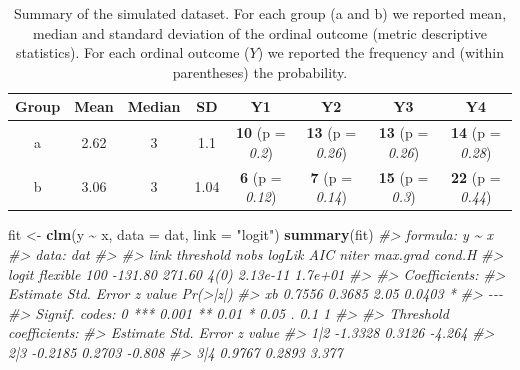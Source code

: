 \documentclass[
  man,floatsintext]{apa6}
\newenvironment{Shaded}{\begin{snugshade}}{\end{snugshade}}
\newcommand{\AttributeTok}[1]{\textcolor[rgb]{0.13,0.29,0.53}{#1}}
\newcommand{\CommentTok}[1]{\textcolor[rgb]{0.56,0.35,0.01}{\textit{#1}}}
\newcommand{\FunctionTok}[1]{\textcolor[rgb]{0.13,0.29,0.53}{\textbf{#1}}}
\newcommand{\NormalTok}[1]{#1}
\newcommand{\OtherTok}[1]{\textcolor[rgb]{0.56,0.35,0.01}{#1}}
\newcommand{\SpecialCharTok}[1]{\textcolor[rgb]{0.81,0.36,0.00}{\textbf{#1}}}
\newcommand{\StringTok}[1]{\textcolor[rgb]{0.31,0.60,0.02}{#1}}
\begin{document}
\begin{table}
\centering
\caption{\label{tab:tab-dataset-example-latex}Summary of the simulated dataset. For each group (a and b) we reported mean, median and standard deviation of the ordinal outcome (metric descriptive statistics). For each ordinal outcome (\(Y\)) we reported the frequency and (within parentheses) the probability.}
\centering
\begin{tabular}[t]{cccccccc}
\toprule
\textbf{Group} & \textbf{Mean} & \textbf{Median} & \textbf{SD} & \textbf{Y1} & \textbf{Y2} & \textbf{Y3} & \textbf{Y4}\\
\midrule
a & 2.62 & 3 & 1.1 & \textbf{10} (p = \textit{0.2}) & \textbf{13} (p = \textit{0.26}) & \textbf{13} (p = \textit{0.26}) & \textbf{14} (p = \textit{0.28})\\
b & 3.06 & 3 & 1.04 & \textbf{6} (p = \textit{0.12}) & \textbf{7} (p = \textit{0.14}) & \textbf{15} (p = \textit{0.3}) & \textbf{22} (p = \textit{0.44})\\
\bottomrule
\end{tabular}
\end{table}

\normalsize

\scriptsize

\normalsize

\scriptsize

\begin{Shaded}
\begin{Highlighting}[]
\NormalTok{fit }\OtherTok{\textless{}{-}} \FunctionTok{clm}\NormalTok{(y }\SpecialCharTok{\textasciitilde{}}\NormalTok{ x, }\AttributeTok{data =}\NormalTok{ dat, }\AttributeTok{link =} \StringTok{"logit"}\NormalTok{)}
\FunctionTok{summary}\NormalTok{(fit)}
\CommentTok{\#\textgreater{} formula: y \textasciitilde{} x}
\CommentTok{\#\textgreater{} data:    dat}
\CommentTok{\#\textgreater{} }
\CommentTok{\#\textgreater{}  link  threshold nobs logLik  AIC    niter max.grad cond.H }
\CommentTok{\#\textgreater{}  logit flexible  100  {-}131.80 271.60 4(0)  2.13e{-}11 1.7e+01}
\CommentTok{\#\textgreater{} }
\CommentTok{\#\textgreater{} Coefficients:}
\CommentTok{\#\textgreater{}    Estimate Std. Error z value Pr(\textgreater{}|z|)  }
\CommentTok{\#\textgreater{} xb   0.7556     0.3685    2.05   0.0403 *}
\CommentTok{\#\textgreater{} {-}{-}{-}}
\CommentTok{\#\textgreater{} Signif. codes:  0 \textquotesingle{}***\textquotesingle{} 0.001 \textquotesingle{}**\textquotesingle{} 0.01 \textquotesingle{}*\textquotesingle{} 0.05 \textquotesingle{}.\textquotesingle{} 0.1 \textquotesingle{} \textquotesingle{} 1}
\CommentTok{\#\textgreater{} }
\CommentTok{\#\textgreater{} Threshold coefficients:}
\CommentTok{\#\textgreater{}     Estimate Std. Error z value}
\CommentTok{\#\textgreater{} 1|2  {-}1.3328     0.3126  {-}4.264}
\CommentTok{\#\textgreater{} 2|3  {-}0.2185     0.2703  {-}0.808}
\CommentTok{\#\textgreater{} 3|4   0.9767     0.2893   3.377}
\end{Highlighting}
\end{Shaded}
\end{document}
